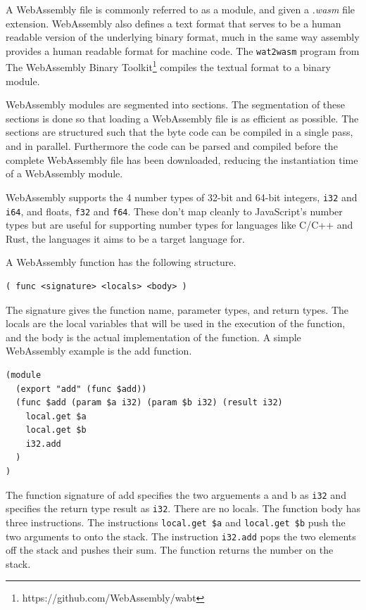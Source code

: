 \documentclass[11pt]{book}
\begin{document}
A WebAssembly file is commonly referred to as a module, and given a \textit{.wasm} file extension. WebAssembly also defines a text format that serves to be a human readable version of the underlying binary format, much in the same way assembly provides a human readable format for machine code. The \texttt{wat2wasm} program from The WebAssembly Binary Toolkit\footnote{https://github.com/WebAssembly/wabt}
compiles the textual format to a binary module.

WebAssembly modules are segmented into sections. The segmentation of these sections is done so that loading a WebAssembly file is as efficient as possible. The sections are structured such that the byte code can be compiled in a single pass, and in parallel. Furthermore the code can be parsed and compiled before the complete WebAssembly file has been downloaded, reducing the instantiation time of a WebAssembly module. 

WebAssembly supports the 4 number types of 32-bit and 64-bit integers, \texttt{i32} and \texttt{i64}, and floats, \texttt{f32} and \texttt{f64}. These don't map cleanly to JavaScript's number types but are useful for supporting number types for languages like C/C++ and Rust, the languages it aims to be a target language for. 

A WebAssembly function has the following structure.
\begin{verbatim}
( func <signature> <locals> <body> )
\end{verbatim}
The signature gives the function name, parameter types, and return types. The locals are the local variables that will be used in the execution of the function, and the body is the actual implementation of the function. A simple WebAssembly example is the add function. 

\begin{verbatim}
(module
  (export "add" (func $add))  
  (func $add (param $a i32) (param $b i32) (result i32)
    local.get $a
    local.get $b
    i32.add
  )
)
\end{verbatim}

The function signature of add specifies the two arguements a and b as \texttt{i32} and specifies the return type result as \texttt{i32}. There are no locals. The function body has three instructions. The instructions \texttt{local.get \$a} and \texttt{local.get \$b} push the two arguments to onto the stack. The instruction \texttt{i32.add} pops the two elements off the stack and pushes their sum. The function returns the number on the stack. 
\end{document}
